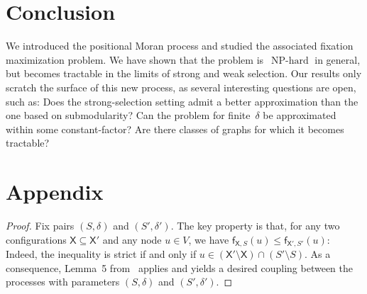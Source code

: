 \documentclass[letterpaper]{article}
\def\mypath{}
\newcommand{\Fitness}{\mathsf{f}}
\newcommand{\X}{\mathsf{X}}
\newcommand{\FitAdv}{\delta}
\newcommand{\NPH}{\operatorname{NP-hard}}
\begin{document}
%
\section{Conclusion}\label{sec:conclusion}

We introduced the positional Moran process and studied the associated fixation maximization problem. 
We have shown that the problem is~$\NPH$ in general, but becomes tractable in the limits of strong and weak selection. 
Our results only scratch the surface of this new process, as several interesting questions are open, such as: Does the strong-selection setting admit a better approximation than the one based on submodularity? 
Can the problem for finite~$\FitAdv$ be approximated within some constant-factor? Are there classes of graphs for which it becomes tractable?




\appendix
\section{Appendix}\label{sec:appendix}

\lemmonotonicity*
\begin{proof}
Fix pairs $(S,\FitAdv)$ and $(S',\FitAdv')$.
The key property is that, for any two configurations $\X\subseteq \X'$ and any node $u\in V$, we have
$\Fitness_{\X,S}(u)\le \Fitness_{\X',S'}(u)$: Indeed, the inequality is strict if and only if $u\in (\X'\setminus \X)\cap (S'\setminus S)$.
 As a consequence, Lemma~5 from~\cite{Diaz2016} applies and
yields a desired coupling between the 
processes with parameters $(S,\FitAdv)$ and $(S',\FitAdv')$.
\end{proof}
\end{document}
